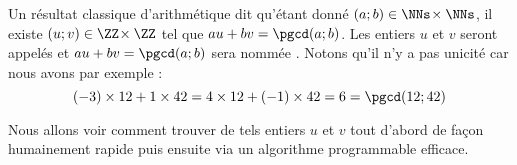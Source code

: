 Un résultat classique d'arithmétique dit qu'étant donné $(a ; b) \in \NNs \!\times \NNs$, il existe $(u ; v) \in \ZZ \!\times \ZZ$ tel que $au + bv = \pgcd(a ; b)$. Les entiers $u$ et $v$ seront appelés  et $au + bv = \pgcd(a ; b)$ sera nommée .
Notons qu'il n'y a pas unicité car nous avons par exemple :
\[(-3) \times 12 + 1 \times 42 = 4 \times 12 + (-1) \times 42 = 6 = \pgcd(12 ; 42)\]

\medskip

Nous allons voir comment trouver de tels entiers $u$ et $v$ tout d'abord de façon humainement rapide puis ensuite via un algorithme programmable efficace.